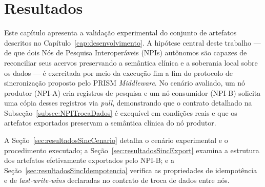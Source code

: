 
\chapter{Resultados}\label{cap:resultados}

Este capítulo apresenta a validação experimental do conjunto de artefatos descritos no Capítulo~\ref{cap:desenvolvimento}. A hipótese central deste trabalho --- de que dois Nós de Pesquisa Interoperáveis (NPIs) autônomos são capazes de reconciliar seus acervos preservando a semântica clínica e a soberania local sobre os dados --- é exercitada por meio da execução fim a fim do protocolo de sincronização proposto pelo PRISM \textit{Middleware}. No cenário avaliado, um nó produtor (NPI-A) cria registros de pesquisa e um nó consumidor (NPI-B) solicita uma cópia desses registros via \textit{pull}, demonstrando que o contrato detalhado na Subseção~\ref{subsec:NPITrocaDados} é exequível em condições reais e que os artefatos exportados preservam a semântica clínica do nó produtor.

A Seção~\ref{sec:resultadosSincCenario} detalha o cenário experimental e o procedimento executado; a Seção~\ref{sec:resultadosSincExport} examina a estrutura dos artefatos efetivamente exportados pelo NPI-B; e a Seção~\ref{sec:resultadosSincIdempotencia} verifica as propriedades de idempotência e de \textit{last-write-wins} declaradas no contrato de troca de dados entre nós.

